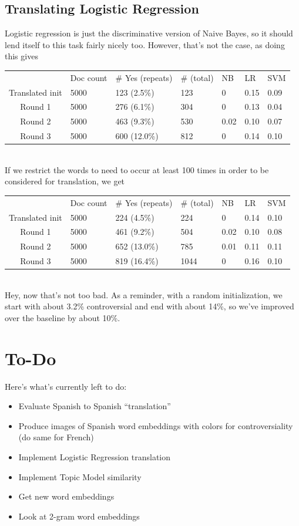 \documentclass[11pt]{article} %
\begin{document}
\subsection{Translating Logistic Regression}

Logistic regression is just the discriminative version of Naive Bayes, so it should lend itself to this task fairly nicely too. However, that's not the case, as doing this gives \\

\begin{tabular}{|c|*{6}{l|}}
\rowcolor{gray!50} & Doc count & \# Yes (repeats) & \# (total) & NB & LR & SVM \\
Translated init & 5000 & 123 (2.5\%) & 123 & 0 &  0.15 & 0.09 \\
Round 1 & 5000 &  276 (6.1\%) & 304 &  0 & 0.13 & 0.04 \\
Round 2 & 5000 & 463 (9.3\%)& 530 & 0.02 & 0.10 & 0.07 \\
Round 3 & 5000 & 600 (12.0\%) & 812 & 0 & 0.14 & 0.10 \\
\end{tabular} \\
If we restrict the words to need to occur at least 100 times in order to be considered for translation, we get

\begin{tabular}{|c|*{6}{l|}}
\rowcolor{gray!50} & Doc count & \# Yes (repeats) & \# (total) & NB & LR & SVM \\
Translated init & 5000 & 224 (4.5\%) & 224 & 0 & 0.14 & 0.10 \\
Round 1 & 5000 &  461 (9.2\%) & 504 & 0.02 & 0.10 & 0.08 \\
Round 2 & 5000 &  652 (13.0\%) & 785 & 0.01 & 0.11 & 0.11 \\
Round 3 & 5000 &  819 (16.4\%) & 1044 & 0 & 0.16 & 0.10 \\
\end{tabular} \\
Hey, now that's not too bad. As a reminder, with a random initialization, we start with about 3.2\% controversial and end with about 14\%, so we've improved over the baseline by about 10\%. 


\section{To-Do}
Here's what's currently left to do:
\begin{itemize}
\item Evaluate Spanish to Spanish ``translation''
\item Produce images of Spanish word embeddings with colors for controversiality (do same for French)
\item Implement Logistic Regression translation
\item Implement Topic Model similarity
\item Get new word embeddings
\item Look at 2-gram word embeddings
\end{itemize}
\end{document}
